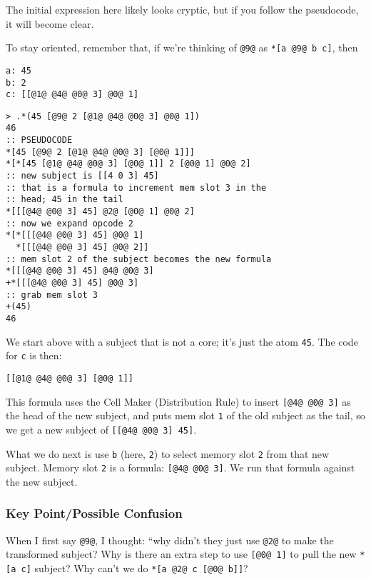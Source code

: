 \documentclass[twoside]{article}
\begin{document}
The initial expression here likely looks cryptic, but if you follow the pseudocode, it will become clear.

To stay oriented, remember that, if we're thinking of \lstinline[style=inlinecode]{@9@} as \lstinline[style=inlinecode]{*[a @9@ b c]}, then

\begin{lstlisting}[style=listingcode]
a: 45
b: 2
c: [[@1@ @4@ @0@ 3] @0@ 1]
\end{lstlisting}

\begin{lstlisting}[style=listingcode]
> .*(45 [@9@ 2 [@1@ @4@ @0@ 3] @0@ 1])
46
:: PSEUDOCODE
*[45 [@9@ 2 [@1@ @4@ @0@ 3] [@0@ 1]]]
*[*[45 [@1@ @4@ @0@ 3] [@0@ 1]] 2 [@0@ 1] @0@ 2]
:: new subject is [[4 0 3] 45]
:: that is a formula to increment mem slot 3 in the
:: head; 45 in the tail
*[[[@4@ @0@ 3] 45] @2@ [@0@ 1] @0@ 2]
:: now we expand opcode 2
*[*[[[@4@ @0@ 3] 45] @0@ 1]
  *[[[@4@ @0@ 3] 45] @0@ 2]]
:: mem slot 2 of the subject becomes the new formula
*[[[@4@ @0@ 3] 45] @4@ @0@ 3]
+*[[[@4@ @0@ 3] 45] @0@ 3]
:: grab mem slot 3
+(45)
46
\end{lstlisting}

We start above with a subject that is not a core; it's just the atom \lstinline[style=inlinecode]{45}. The code for \lstinline[style=inlinecode]{c} is then:

\begin{lstlisting}[style=listingcode]
[[@1@ @4@ @0@ 3] [@0@ 1]]
\end{lstlisting}

This formula uses the Cell Maker (Distribution Rule) to insert \lstinline[style=inlinecode]{[@4@ @0@ 3]} as the head of the new subject, and puts mem slot \lstinline[style=inlinecode]{1} of the old subject as the tail, so we get a new subject of \lstinline[style=inlinecode]{[[@4@ @0@ 3] 45]}.

What we do next is use \lstinline[style=inlinecode]{b} (here, \lstinline[style=inlinecode]{2}) to select memory slot \lstinline[style=inlinecode]{2} from that new subject. Memory slot \lstinline[style=inlinecode]{2} is a formula: \lstinline[style=inlinecode]{[@4@ @0@ 3]}. We run that formula against the new subject.

\subsubsection{Key Point/Possible Confusion}

When I first say \lstinline[style=inlinecode]{@9@}, I thought: ``why didn't they just use \lstinline[style=inlinecode]{@2@} to make the transformed subject? Why is there an extra step to use \lstinline[style=inlinecode]{[@0@ 1]} to pull the new \lstinline[style=inlinecode]{*[a c]} subject? Why can't we do \lstinline[style=inlinecode]{*[a @2@ c [@0@ b]]}?
\end{document}
